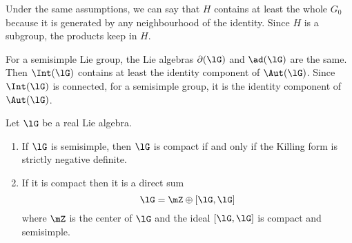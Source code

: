Under the same assumptions, we can say that $H$ contains at least the whole $G_0$ because it is generated by any neighbourhood of the identity. Since $H$ is a subgroup, the products keep in $H$.

For a semisimple Lie group, the Lie algebras $\partial(\lG)$ and $\ad(\lG)$ are the same. Then $\Int(\lG)$ contains at least the identity component of $\Aut(\lG)$. Since $\Int(\lG)$ is connected, for a semisimple group, it is the identity component of $\Aut(\lG)$.

\begin{proposition}     \label{ProplGcompactKillNeg}\label{prop:compact_Killing}
    Let $\lG$ be a real Lie algebra.
    \begin{enumerate}
    \item If $\lG$ is semisimple, then $\lG$ is compact if and only if  the Killing form is strictly negative definite.
    \item If it is compact then it is a direct sum
    \begin{equation}
    \lG=\mZ\oplus [\lG,\lG]
    \end{equation}
    where $\mZ$ is the center of $\lG$ and the ideal $[\lG,\lG]$ is compact and semisimple.
    \end{enumerate}
\end{proposition}

